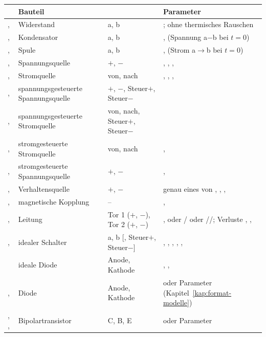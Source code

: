 \begin{longtable}{@{}P{2.6cm}P{3.6cm}P{2.6cm}P{5.0cm}@{}}
  \toprule
   & Bauteil &  & Parameter \\
  \midrule
  \endhead
  \bottomrule
  \endfoot
  ,  & Widerstand & a, b & ;  ohne thermisches Rauschen \\
  ,  & Kondensator & a, b & ,  (Spannung a$-$b bei $t=0$) \\
  ,  & Spule & a, b & ,  (Strom a$\to$b bei $t=0$) \\
  ,  & Spannungsquelle & $+$, $-$ & , , ,  \\
  ,  & Stromquelle & von, nach & , , ,  \\
  ,  & spannungsgesteuerte Spannungsquelle & $+$, $-$, Steuer$+$, Steuer$-$ &  \\
  ,  & spannungsgesteuerte Stromquelle & von, nach, Steuer$+$, Steuer$-$ &  \\
  ,  & stromgesteuerte Stromquelle & von, nach & ,  \\
  ,  & stromgesteuerte Spannungsquelle & $+$, $-$ & ,  \\
  ,  & Verhaltensquelle & $+$, $-$ & genau eines von , , ,  \\
  ,  & magnetische Kopplung & – & ,  \\
  ,  & Leitung & Tor 1 ($+$, $-$), Tor 2 ($+$, $-$) & ,  oder / oder //; Verluste , ,  \\
  ,  & idealer Schalter & a, b [, Steuer$+$, Steuer$-$] & , , , , ,  \\
   & ideale Diode & Anode, Kathode & , ,  \\
  ,  & Diode & Anode, Kathode &  oder Parameter (Kapitel~\ref{kap:format-modelle}) \\
  , ,  & Bipolartransistor & C, B, E &  oder Parameter \\

\end{longtable}
